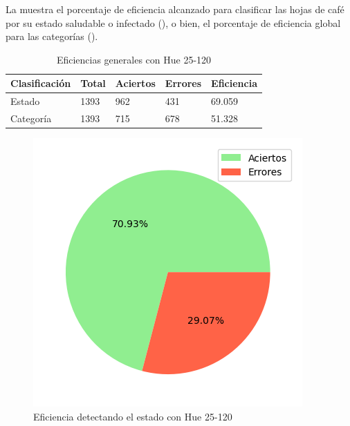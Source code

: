 La  muestra el porcentaje de eficiencia alcanzado para clasificar las hojas de café por su estado saludable o infectado (), o bien, el porcentaje de eficiencia global para las categorías ().

\begin{table}[h!]
\centering
\begin{tabular}{|l|l|l|l|l|}
\hline 
\textbf{Clasificación} & \textbf{Total} & \textbf{Aciertos} & \textbf{Errores} & \textbf{Eficiencia} \\
\hline
Estado & 1393 & 962 & 431 & 69.059 \\
\hline 
Categoría & 1393 & 715 & 678 & 51.328 \\
\hline 
\end{tabular}
\caption{Eficiencias generales con Hue 25-120}
\label{table:efficiency_general_25_120}
\end{table}

\captionsetup[figure]{skip=-10pt}

\begin{figure}[!ht]
\centering
\includegraphics[scale=0.6]{images/result_global_state_25_120.png}
\caption{Eficiencia detectando el estado con Hue 25-120}
\label{img:efficiency_state_25_120}
\end{figure}

